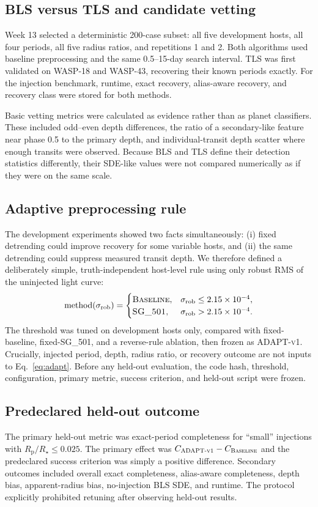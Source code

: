 \documentclass[11pt]{article}
\newcommand{\rprs}{$R_{\mathrm p}/R_\star$}
\newcommand{\adapt}{\textsc{ADAPT-v1}}
\newcommand{\sg}[1]{\textsc{SG\_#1}}
\newcommand{\baseline}{\textsc{Baseline}}
\begin{document}
\subsection{BLS versus TLS and candidate vetting}
Week 13 selected a deterministic 200-case subset: all five development hosts, all four periods, all five radius ratios, and repetitions 1 and 2. Both algorithms used baseline preprocessing and the same 0.5--15-day search interval. TLS was first validated on WASP-18 and WASP-43, recovering their known periods exactly. For the injection benchmark, runtime, exact recovery, alias-aware recovery, and recovery class were stored for both methods.

Basic vetting metrics were calculated as evidence rather than as planet classifiers. These included odd--even depth differences, the ratio of a secondary-like feature near phase 0.5 to the primary depth, and individual-transit depth scatter where enough transits were observed. Because BLS and TLS define their detection statistics differently, their SDE-like values were not compared numerically as if they were on the same scale.

\subsection{Adaptive preprocessing rule}
The development experiments showed two facts simultaneously: (i) fixed detrending could improve recovery for some variable hosts, and (ii) the same detrending could suppress measured transit depth. We therefore defined a deliberately simple, truth-independent host-level rule using only robust RMS of the uninjected light curve:
\begin{equation}
\mathrm{method}(\sigma_{\rm rob})=
\begin{cases}
\baseline, & \sigma_{\rm rob}\leq 2.15\times10^{-4},\\
\sg{501}, & \sigma_{\rm rob}>2.15\times10^{-4}.
\end{cases}
\label{eq:adapt}
\end{equation}
The threshold was tuned on development hosts only, compared with fixed-baseline, fixed-\sg{501}, and a reverse-rule ablation, then frozen as \adapt. Crucially, injected period, depth, radius ratio, or recovery outcome are not inputs to Eq.~\ref{eq:adapt}. Before any held-out evaluation, the code hash, threshold, configuration, primary metric, success criterion, and held-out script were frozen.

\subsection{Predeclared held-out outcome}
The primary held-out metric was exact-period completeness for ``small'' injections with \rprs$\leq0.025$. The primary effect was $C_{\adapt}-C_{\baseline}$ and the predeclared success criterion was simply a positive difference. Secondary outcomes included overall exact completeness, alias-aware completeness, depth bias, apparent-radius bias, no-injection BLS SDE, and runtime. The protocol explicitly prohibited retuning after observing held-out results.
\end{document}
